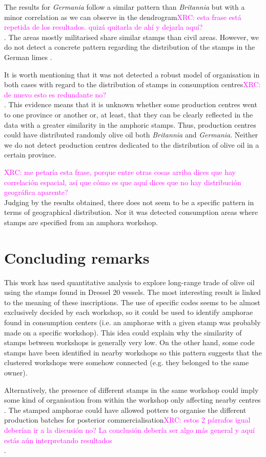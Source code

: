 \documentclass[review]{elsarticle}
\newcommand{\memo}[2]{\textcolor{#1}{#2}}
\newcommand{\xavi}[1]{\memo{magenta}{XRC: #1\\}}
\begin{document}
The results for \textit{Germania} follow a similar pattern than \textit{Britannia} but with a minor correlation as we can observe in the dendrogram\xavi{esta frase está repetida de los resultados. quizá quitarla de ahí y dejarla aquí?}. The areas mostly militarised share similar stamps than civil areas. However, we do not detect a concrete pattern regarding the distribution of the stamps in the German limes \citep{xanten2018}. 

It is worth mentioning that it was not detected a robust model of organisation in both cases with regard to the distribution of stamps in consumption centres\xavi{de nuevo esto es redundante no?}. This evidence means that it is unknown whether some production centres went to one province or another or, at least, that they can be clearly reflected in the data with a greater similarity in the amphoric stamps. Thus, production centres could have distributed randomly olive oil both \textit{Britannia} and \textit{Germania}. Neither we do not detect production centres dedicated to the distribution of olive oil in a certain province. 


\xavi{me petaría esta frase, porque entre otras cosas arriba dices que hay correlación espacial, así que cómo es que aquí dices que no hay distribución geográfica aparente?}Judging by the results obtained, there does not seem to be a specific pattern in terms of geographical distribution. Nor it was detected consumption areas where stamps are specified from an amphora workshop. 


\section{Concluding remarks}

This work has used quantitative analysis to explore long-range trade of olive oil using the stamps found in Dressel 20 vessels. The most interesting result is linked to the meaning of these inscriptions. The use of specific codes seems to be almost exclusively decided by each workshop, so it could be used to identify amphorae found in consumption centers (i.e. an amphorae with a given stamp was probably made on a specific workshop). This idea could explain why the similarity of stamps between workshops is generally very low. On the other hand, some code stamps have been identified in nearby workshops so this pattern suggests that the clustered workshops were somehow connected (e.g. they belonged to the same owner).

Alternatively, the presence of different stamps in the same workshop could imply some kind of organisation from within the workshop only affecting nearby centres \citep{juanmorostesis}. The stamped amphorae could have allowed potters to organise the different production batches for posterior commercialisation\xavi{estos 2 párrafos igual deberían ir a la discusión no? La conclusión debería ser algo más general y aquí estás aún interpretando resultados}.  
\end{document}
